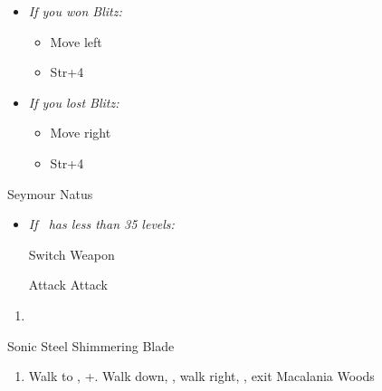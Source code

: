 \begin{spheregrid}
\begin{itemize}
	\yunaf
	\item \textit{If you won Blitz:}
	\begin{itemize}
		\item Move left
		\item Str+4
	\end{itemize}
	\item \textit{If you lost Blitz:}
	\begin{itemize}
		\item Move right
		\item Str+4
	\end{itemize}
\end{itemize}
\end{spheregrid}
		
\begin{battle}[36000]{Seymour Natus}
\begin{itemize}
	\item \textit{If \lulu\ has less than 35 levels:}
	\begin{itemize}
		\switch{\tidus}{\lulu}
		\luluf Switch Weapon
		\switch{\lulu}{\tidus}
	\end{itemize}
	\tidusf Attack
	\summon{\bahamut}
	\bahamutf Attack
\end{itemize}
\end{battle}
\begin{enumerate}[resume]
	\item \sd
\end{enumerate}
\begin{equip}
\begin{itemize}
	\tidusf Sonic Steel
	\auronf Shimmering Blade
\end{itemize}
\end{equip}
\begin{enumerate}[resume]
	\item Walk to \yuna, \cs+\skippablefmv[10:10]. Walk down, \cs[1:40], walk right, \save, exit Macalania Woods
\end{enumerate}	